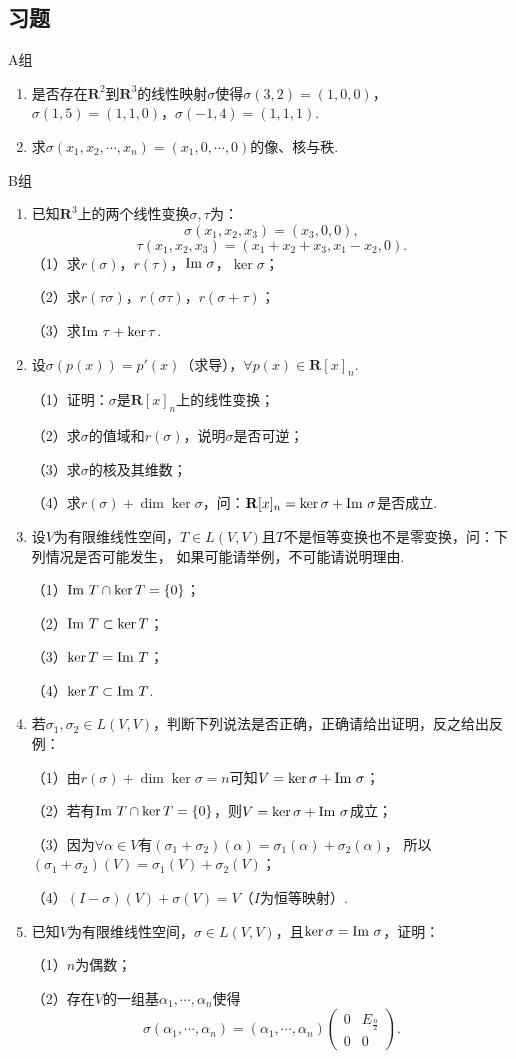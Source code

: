 \subsection{习题}
\centerline{\heiti A组}
\begin{enumerate}
	\item 是否存在$\mathbf{R}^2$到$\mathbf{R}^3$的线性映射$\sigma$使得$\sigma(3,2)=(1,0,0)$，$\sigma(1,5)=(1,1,0)$，$\sigma(-1,4)=(1,1,1)$.
	\item 求$\sigma(x_1,x_2,\cdots,x_n)=(x_1,0,\cdots,0)$的像、核与秩.
\end{enumerate}
\centerline{\heiti B组}
\begin{enumerate}
	\item 已知$\mathbf{R}^3$上的两个线性变换$\sigma,\tau$为：
	$$\sigma(x_1,x_2,x_3)=(x_3,0,0),$$
	$$\tau(x_1,x_2,x_3)=(x_1+x_2+x_3,x_1-x_2,0).$$
	（1）求$r(\sigma)$，$r(\tau)$，$\textup{Im }\sigma$，$\ker\sigma$；

	（2）求$r(\tau\sigma)$，$r(\sigma\tau)$，$r(\sigma+\tau)$；

	（3）求$\textup{Im }\tau+\ker\tau$.
	\item 设$\sigma(p(x))=p'(x)$（求导），$\forall p(x) \in \mathbf{R}[x]_n$.
	
	（1）证明：$\sigma$是$\mathbf{R}[x]_n$上的线性变换；

	（2）求$\sigma$的值域和$r(\sigma)$，说明$\sigma$是否可逆；

	（3）求$\sigma$的核及其维数；

	（4）求$r(\sigma)+\dim\ker\sigma$，问：$\mathbf{R}[x]_n=\ker\sigma+\textup{Im }\sigma$是否成立.
	\item 设$V$为有限维线性空间，$T\in L(V,V)$且$T$不是恒等变换也不是零变换，问：下列情况是否可能发生，
	如果可能请举例，不可能请说明理由.

	（1）$\textup{Im }T \cap \ker T = \{0\}$；

	（2）$\textup{Im }T \subset \ker T$；

	（3）$\ker T = \textup{Im }T$；

	（4）$\ker T \subset \textup{Im }T$.
	\item 若$\sigma_1,\sigma_2\in L(V,V)$，判断下列说法是否正确，正确请给出证明，反之给出反例：
	
	（1）由$r(\sigma)+\dim\ker\sigma=n$可知$V=\ker\sigma+\textup{Im }\sigma$；

	（2）若有$\textup{Im }T \cap \ker T = \{0\}$，则$V=\ker\sigma+\textup{Im }\sigma$成立；

	（3）因为$\forall \alpha \in V$有$(\sigma_1+\sigma_2)(\alpha)=\sigma_1(\alpha)+\sigma_2(\alpha)$，
	所以$(\sigma_1+\sigma_2)(V)=\sigma_1(V)+\sigma_2(V)$；

	（4）$(I-\sigma)(V)+\sigma(V)=V$（$I$为恒等映射）.
	\item 已知$V$为有限维线性空间，$\sigma\in L(V,V)$，且$\ker\sigma=\textup{Im }\sigma$，证明：
	
	（1）$n$为偶数；

	（2）存在$V$的一组基$\alpha_1,\cdots,\alpha_n$使得
	$$\sigma(\alpha_1,\cdots,\alpha_n)=(\alpha_1,\cdots,\alpha_n)\begin{pmatrix}
		0 & E_{\frac{n}{2}} \\ 0 & 0
	\end{pmatrix}.$$
\end{enumerate}
